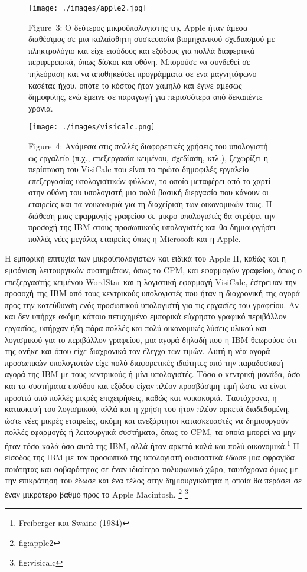 \documentclass[
]{article}
\begin{document}
\leavevmode{}%
\begin{figure}
\hypertarget{fig:apple2}{%
\centering
\texttt{[image: ./images/apple2.jpg]}
\caption{Figure~3: Ο δεύτερος μικροϋπολογιστής της Apple ήταν άμεσα
διαθέσιμος σε μια καλαίσθητη συσκευασία βιομηχανικού σχεδιασμού με
πληκτρολόγιο και είχε εισόδους και εξόδους για πολλά διαφερτικά
περιφερειακά, όπως δίσκοι και οθόνη. Μπορούσε να συνδεθεί σε τηλεόραση
και να αποθηκεύσει προγράμματα σε ένα μαγνητόφωνο κασέτας ήχου, οπότε το
κόστος ήταν χαμηλό και έγινε αμέσως δημοφιλής, ενώ έμεινε σε παραγωγή
για περισσότερα από δεκαπέντε χρόνια.}\label{fig:apple2}
}
\end{figure}

\leavevmode{}%
\begin{figure}
\hypertarget{fig:visicalc}{%
\centering
\texttt{[image: ./images/visicalc.png]}
\caption{Figure~4: Ανάμεσα στις πολλές διαφορετικές χρήσεις του
υπολογιστή ως εργαλείο (π.χ., επεξεργασία κειμένου, σχεδίαση, κτλ.),
ξεχωρίζει η περίπτωση του VisiCalc που είναι το πρώτο δημοφιλές εργαλείο
επεξεργασίας υπολογιστικών φύλλων, το οποίο μεταφέρει από το χαρτί στην
οθόνη του υπολογιστή μια πολύ βασική διεργασία που κάνουν οι εταιρείες
και τα νοικοκυριά για τη διαχείριση των οικονομικών τους. Η διάθεση μιας
εφαρμογής γραφείου σε μικρο-υπολογιστές θα στρέψει την προσοχή της IBM
στους προσωπικούς υπολογιστές και θα δημιουργήσει πολλές νέες μεγάλες
εταιρείες όπως η Microsoft και η Apple.}\label{fig:visicalc}
}
\end{figure}

Η εμπορική επιτυχία των μικροϋπολογιστών και ειδικά του Apple II, καθώς
και η εμφάνιση λειτουργικών συστημάτων, όπως το CPΜ, και εφαρμογών
γραφείου, όπως ο επεξεργαστής κειμένου WordStar και η λογιστική εφαρμογή
VisiCalc, έστρεψαν την προσοχή της IBM από τους κεντρικούς υπολογιστές
που ήταν η διαχρονική της αγορά προς την κατεύθυνση ενός προσωπικού
υπολογιστή για τις εργασίες του γραφείου. Αν και δεν υπήρχε ακόμη κάποιο
πετυχημένο εμπορικά εύχρηστο γραφικό περιβάλλον εργασίας, υπήρχαν ήδη
πάρα πολλές και πολύ οικονομικές λύσεις υλικού και λογισμικού για το
περιβάλλον γραφείου, μια αγορά δηλαδή που η IBM θεωρούσε ότι της ανήκε
και όπου είχε διαχρονικά τον έλεγχο των τιμών. Αυτή η νέα αγορά
προσωπικών υπολογιστών είχε πολύ διαφορετικές ιδιότητες από την
παραδοσιακή αγορά της IBM με τους κεντρικούς ή μίνι-υπολογιστές. Τόσο ο
κεντρική μονάδα, όσο και τα συστήματα εισόδου και εξόδου είχαν πλέον
προσβάσιμη τιμή ώστε να είναι προσιτά από πολλές μικρές επιχειρήσεις,
καθώς και νοικοκυριά. Ταυτόχρονα, η κατασκευή του λογισμικού, αλλά και η
χρήση του ήταν πλέον αρκετά διαδεδομένη, ώστε νέες μικρές εταιρείες,
ακόμη και ανεξάρτητοι κατασκευαστές να δημιουργούν πολλές εφαρμογές ή
λειτουργικά συστήματα, όπως το CPM, τα οποία μπορεί να μην ήταν τόσο
καλά όσο αυτά της IBM, αλλά ήταν αρκετά καλά και πολύ
οικονομικά.\footnote{Freiberger και Swaine (1984)} Η είσοδος της IBM με
τον προσωπικό της υπολογιστή ουσιαστικά έδωσε μια σφραγίδα ποιότητας και
σοβαρότητας σε έναν ιδιαίτερα πολυφωνικό χώρο, ταυτόχρονα όμως με την
επικράτηση του έδωσε και ένα τέλος στην δημιουργικότητα η οποία θα
περάσει σε έναν μικρότερο βαθμό προς το Apple Macintosh. \footnote{fig:apple2}
\footnote{fig:visicalc}
\end{document}
